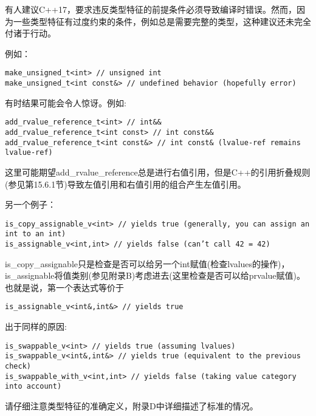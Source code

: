 \begin{tcolorbox}[colback=webgreen!5!white,colframe=webgreen!75!black]
\hspace*{0.75cm}有人建议C++17，要求违反类型特征的前提条件必须导致编译时错误。然而，因为一些类型特征有过度约束的条件，例如总是需要完整的类型，这种建议还未完全付诸于行动。
\end{tcolorbox}

例如：

\begin{lstlisting}[style=styleCXX]
make_unsigned_t<int> // unsigned int
make_unsigned_t<int const&> // undefined behavior (hopefully error)
\end{lstlisting}

有时结果可能会令人惊讶。例如:

\begin{lstlisting}[style=styleCXX]
add_rvalue_reference_t<int> // int&&
add_rvalue_reference_t<int const> // int const&&
add_rvalue_reference_t<int const&> // int const& (lvalue-ref remains lvalue-ref)
\end{lstlisting}

这里可能期望add\_rvalue\_reference总是进行右值引用，但是C++的引用折叠规则(参见第15.6.1节)导致左值引用和右值引用的组合产生左值引用。

另一个例子：

\begin{lstlisting}[style=styleCXX]
is_copy_assignable_v<int> // yields true (generally, you can assign an int to an int)
is_assignable_v<int,int> // yields false (can’t call 42 = 42)
\end{lstlisting}

is\_copy\_assignable只是检查是否可以给另一个int赋值(检查lvalues的操作)，is\_assignable将值类别(参见附录B)考虑进去(这里检查是否可以给prvalue赋值)。也就是说，第一个表达式等价于

\begin{lstlisting}[style=styleCXX]
is_assignable_v<int&,int&> // yields true
\end{lstlisting}

出于同样的原因:

\begin{lstlisting}[style=styleCXX]
is_swappable_v<int> // yields true (assuming lvalues)
is_swappable_v<int&,int&> // yields true (equivalent to the previous check)
is_swappable_with_v<int,int> // yields false (taking value category into account)
\end{lstlisting}

请仔细注意类型特征的准确定义，附录D中详细描述了标准的情况。

